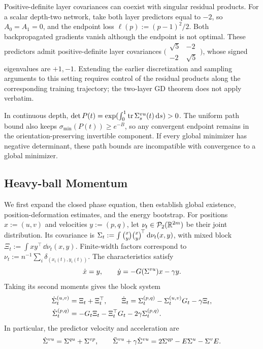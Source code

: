 \begin{remark}
Positive-definite layer covariances can coexist with singular residual
products. For a scalar depth-two network, take both layer predictors equal to $-2$,
so $A_0=A_1=0$, and the endpoint loss $\ell(p):=(p-1)^2/2$.
Both backpropagated gradients vanish although the endpoint is not optimal.
These predictors admit positive-definite layer covariances
$\bigl(\begin{smallmatrix}\sqrt5&-2\\-2&\sqrt5\end{smallmatrix}\bigr)$,
whose signed eigenvalues are $+1,-1$. Extending the earlier discretization and sampling arguments to this setting
requires control of the residual products along the corresponding training
trajectory; the two-layer GD theorem does not apply verbatim.

In continuous depth, $\det P(t)=
\exp(\int_0^1\operatorname{tr}\Sigma^{vu}_s(t)\,\mathrm{d} s)>0$.
The uniform path bound also keeps $\sigma_{\min}(P(t))\ge e^{-B}$,
so any convergent endpoint remains in the orientation-preserving
invertible component. If every global minimizer has negative determinant,
these path bounds are incompatible with convergence to a global minimizer.
\end{remark}

\subsection{Heavy-ball Momentum}\label{app:momentum-proof}
We first expand the closed phase equation, then establish global
existence, position-deformation estimates, and the energy bootstrap.
For positions $x:=(u,v)$ and velocities $y:=(p,q)$, let
$\nu_t\in\mathcal P_2(\mathbb{R}^{2m})$ be their joint distribution. Its covariance is
$\Sigma_t:=\int\binom xy\binom xy^{\!\top}\,\mathrm{d}\nu_t(x,y)$,
with mixed block $\Xi_t:=\int xy^\top\,\dd\nu_t(x,y)$.
Finite-width factors correspond to
$\nu_t:=n^{-1}\sum_i\delta_{(x_i(t),y_i(t))}$.
The characteristics satisfy
\begin{equation}
\label{eq:single-particle-momentum-main}
\dot x=y,\qquad
\dot y=-G(\Sigma^{vu})x-\gamma y.
\end{equation}
Taking its second moments gives the block system
\begin{equation}
\label{eq:phase-block-ode}
\begin{aligned}
\dot{\Sigma}^{(u,v)}_t&=\Xi_t+\Xi_t^\top,\qquad
\dot\Xi_t=\Sigma^{(p,q)}_t-\Sigma^{(u,v)}_tG_t-\gamma\Xi_t,\\
\dot{\Sigma}^{(p,q)}_t&=-G_t\Xi_t-\Xi_t^\top G_t-2\gamma\Sigma^{(p,q)}_t.
\end{aligned}
\end{equation}
In particular, the predictor velocity and acceleration are
\begin{equation}\label{eq:predictor-speed}
 \dot{\Sigma}^{vu}=\Sigma^{qu}+\Sigma^{vp},\qquad
 \ddot{\Sigma}^{vu}+\gamma\dot{\Sigma}^{vu}=2\Sigma^{qp}-E\Sigma^u-\Sigma^v E.
\end{equation}

